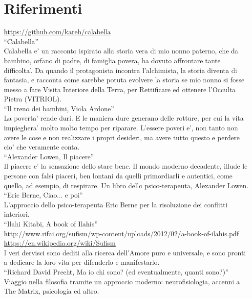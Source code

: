 \chapter{Riferimenti}
\label{chapRiferimenti}

  \url{https://github.com/kareh/calabella}\\
  ``Calabella''\\
  Calabella e' un racconto ispirato alla storia vera di mio nonno paterno, che da bambino, orfano di padre, di famiglia povera, ha dovuto affrontare tante difficolta'. Da quando il protagonista incontra l'alchimista, la storia diventa di fantasia, e racconta come sarebbe potuta evolvere la storia se mio nonno si fosse messo a fare Visita Interiore della Terra, per Rettificare ed ottenere l'Occulta Pietra (VITRIOL).\\

  ``Il treno dei bambini, Viola Ardone''\\
  La poverta' rende duri. E le maniera dure generano delle rotture, per cui la vita impieghera'
  molto molto tempo per riparare. L'essere poveri e', non tanto non avere le cose e non realizzare
  i propri desideri, ma avere tutto questo e perdere cio' che veramente conta.\\

  ``Alexander Lowen, Il piacere''\\
  Il piacere e' la sensazione dello stare bene. Il mondo moderno decadente, illude le persone
  con falsi piaceri, ben lontani da quelli primordiarli e autentici, come quello, ad esempio,
  di respirare. Un libro dello psico-terapeuta, Alexander Lowen.\\
  
  ``Eric Berne, Ciao... e poi''\\
  L'approccio dello psico-terapeuta Eric Berne per la risoluzione dei conflitti interiori.\\

  
  ``Ilahi Kitabi, A book of Ilahis''\\
  \url{http://www.rifai.org/sufism/wp-content/uploads/2012/02/a-book-of-ilahis.pdf}\\
  \url{https://en.wikipedia.org/wiki/Sufism}\\
  I veri dervisci sono dediti alla ricerca dell'Amore puro e universale, e sono pronti a
  dedicare la loro vita per difenderlo e manifestarlo.\\

  ``Richard David Precht, Ma io chi sono? (ed eventualmente, quanti sono?)''\\
  Viaggio nella filosofia tramite un approccio moderno: neurofisiologia, accenni a The Matrix, psicologia ed altro.\\
   
